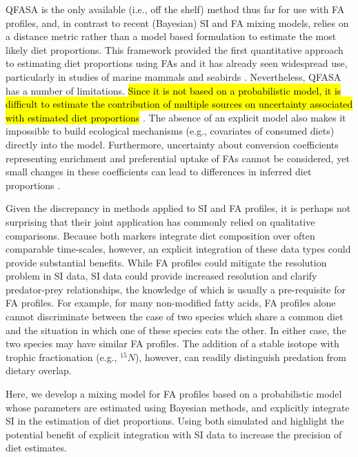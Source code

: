 \documentclass[fleqn,10pt]{wlpeerj}
\begin{document}
QFASA is the only available (i.e., off the shelf) method thus far for use with FA profiles, and, in
contrast to recent (Bayesian) SI and FA mixing models, relies on a distance
metric rather than a model based formulation to estimate the most
likely diet proportions. This framework provided the first
quantitative approach to estimating diet proportions using FAs
and it has already seen widespread use, particularly in studies of
marine mammals \citep{bowen_methods_2012} and seabirds
\citep{williams_using_2010}. Nevertheless, QFASA has a number of
limitations. \hl{Since it is not based on a probabilistic model, it is
difficult to estimate the contribution of multiple sources on uncertainty associated with estimated diet
proportions} \citep[but see][ \hl{for a treatment of confidence intervals in QFASA}]{stewart2011managing, stewart2013zero}. The absence of an explicit model
also makes it impossible to build ecological mechanisms (e.g.,
covariates of consumed diets) directly into the model. Furthermore,
uncertainty about conversion coefficients representing enrichment and
preferential uptake of FAs cannot be considered, yet small
changes in these coefficients can lead to differences in inferred diet
proportions \citep{wang_validating_2010}.

Given the discrepancy in methods applied to SI and FA profiles, it is
perhaps not surprising that their joint application has commonly
relied on qualitative comparisons. Because both markers integrate diet
composition over often comparable time-scales, however, an explicit
integration of these data types could provide substantial
benefits. While FA profiles could mitigate the resolution problem in SI
data, SI data could provide increased resolution and clarify
predator-prey relationships, the knowledge of which is usually a
pre-requisite for FA profiles. For example, for many non-modified fatty
acids, FA profiles alone cannot discriminate between the case of two species
which share a common diet and the situation in which one of these
species eats the other.  In either case, the two species may have
similar FA profiles. The addition of a stable isotope with trophic
fractionation (e.g., $^{15}N$), however, can readily distinguish predation
from dietary overlap.

Here, we develop a mixing model for FA profiles based on a probabilistic
model whose parameters are estimated using Bayesian methods, and
explicitly integrate SI in the estimation of diet proportions. Using both simulated and
highlight the potential benefit of explicit integration with SI data
to increase the precision of diet estimates.
\end{document}
